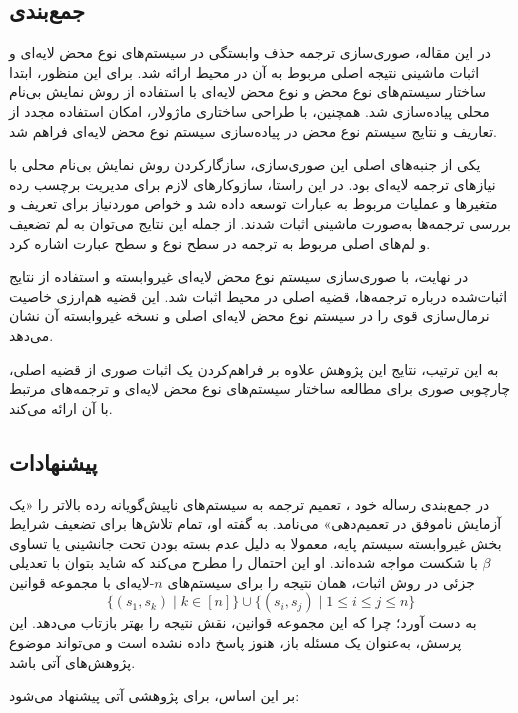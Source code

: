 \documentclass[11pt,twocolumn,a4paper,twoside]{article}
\theoremstyle{definition}
\theoremstyle{theorem}
\theoremstyle{definition}
\theoremstyle{definition}
\theoremstyle{definition}
\theoremstyle{definition}
\theoremstyle{definition}
\begin{document}
\subsection{جمع‌بندی}

در این مقاله، صوری‌سازی ترجمه حذف‌ وابستگی در سیستم‌های نوع محض لایه‌ای و اثبات ماشینی نتیجه اصلی مربوط به آن در محیط  ارائه شد. برای این منظور، ابتدا ساختار سیستم‌های نوع محض و نوع محض لایه‌ای با استفاده از روش نمایش بی‌نام محلی پیاده‌سازی شد. همچنین، با طراحی ساختاری ماژولار، امکان استفاده مجدد از تعاریف و نتایج سیستم نوع محض در پیاده‌سازی سیستم نوع محض لایه‌ای فراهم شد.

یکی از جنبه‌های اصلی این صوری‌سازی، سازگارکردن روش نمایش بی‌نام محلی با نیازهای ترجمه لایه‌ای بود. در این راستا، سازوکارهای لازم برای مدیریت برچسب رده متغیرها و عملیات مربوط به عبارات توسعه داده شد و خواص موردنیاز برای تعریف و بررسی ترجمه‌ها به‌صورت ماشینی اثبات شدند. از جمله این نتایج می‌توان به لم تضعیف و لم‌های اصلی مربوط به ترجمه در سطح نوع و سطح عبارت اشاره کرد.

در نهایت، با صوری‌سازی سیستم نوع محض لایه‌ای غیروابسته و استفاده از نتایج اثبات‌شده درباره ترجمه‌ها، قضیه اصلی  در محیط  اثبات شد. این قضیه هم‌ارزی خاصیت نرمال‌سازی قوی را در سیستم نوع محض لایه‌ای اصلی و نسخه غیروابسته آن نشان می‌دهد.

به این ترتیب، نتایج این پژوهش علاوه بر فراهم‌کردن یک اثبات صوری از قضیه اصلی، چارچوبی صوری برای مطالعه ساختار سیستم‌های نوع محض لایه‌ای و ترجمه‌های مرتبط با آن ارائه می‌کند.

\subsection{پیشنهادات}

در جمع‌بندی رساله خود
\cite{mull2023}،
تعمیم ترجمه
 \cite{geuvers1991}
به سیستم‌های ناپیش‌گویانه رده بالاتر را «یک آزمایش ناموفق در تعمیم‌دهی» می‌نامد.
به گفته او، تمام تلاش‌ها برای تضعیف شرایط بخش غیروابسته سیستم پایه، معمولا به دلیل عدم بسته بودن تحت جانشینی یا تساوی
$\beta$
با شکست مواجه شده‌اند. او این احتمال را مطرح می‌کند که شاید بتوان با تعدیلی جزئی در روش اثبات، همان نتیجه را برای سیستم‌های
$n$-لایه‌ای
با مجموعه قوانین
\[
\{(s_1, s_k) \mid k \in [n]\} \cup \{(s_i, s_j) \mid 1 \le i \le j \le n\}
\]
به دست آورد؛ چرا که این مجموعه قوانین، نقش نتیجه 
را بهتر بازتاب می‌دهد. این پرسش، به‌عنوان یک مسئله باز، هنوز
پاسخ داده نشده است و می‌تواند موضوع پژوهش‌های آتی باشد.

بر این اساس، برای پژوهشی آتی پیشنهاد می‌شود:
\end{document}
